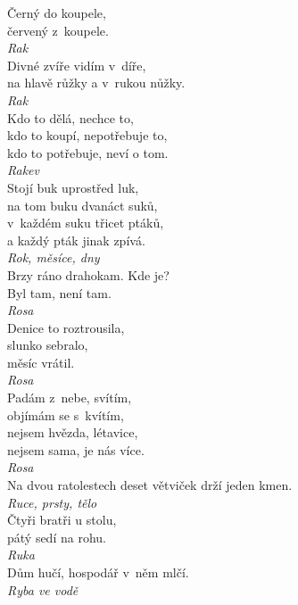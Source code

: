 \begin{multicols}{3}
\noindent
Černý do koupele,\\
červený z~koupele.\\[1 mm]
{\sl Rak}\\

\noindent
Divné zvíře vidím v~díře,\\
na hlavě růžky a v~rukou nůžky.\\[1 mm]
{\sl Rak}\\

\noindent
Kdo to dělá, nechce to,\\
kdo to koupí, nepotřebuje to,\\
kdo to potřebuje, neví o tom.\\[1 mm]
{\sl Rakev}\\

\noindent
Stojí buk uprostřed luk,\\
na tom buku dvanáct suků,\\
v~každém suku třicet ptáků,\\
a každý pták jinak zpívá.\\[1 mm]
{\sl Rok, měsíce, dny}\\

\noindent
Brzy ráno drahokam. Kde je?\\
Byl tam, není tam.\\[1 mm]
{\sl Rosa}\\

\noindent
Denice to roztrousila,\\
slunko sebralo,\\
měsíc vrátil.\\[1 mm]
{\sl Rosa}\\

\noindent
Padám z~nebe, svítím,\\
objímám se s~kvítím,\\
nejsem hvězda, létavice,\\
nejsem sama, je nás více.\\[1 mm]
{\sl Rosa}\\

\noindent
Na dvou ratolestech deset větviček drží jeden kmen.\\[1 mm]
{\sl Ruce, prsty, tělo}\\

\noindent
Čtyři bratři u stolu, \\
pátý sedí na rohu.\\[1 mm]
{\sl Ruka}\\

\noindent
Dům hučí, hospodář v~něm mlčí.\\[1 mm]
{\sl Ryba ve vodě}\\


\end{multicols}
